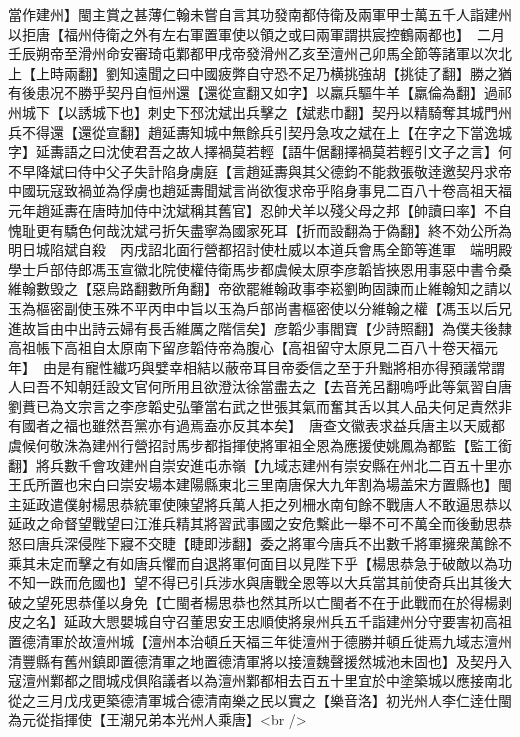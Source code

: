 當作建州】閩主賞之甚薄仁翰未嘗自言其功發南都侍衛及兩軍甲士萬五千人詣建州以拒唐【福州侍衛之外有左右軍置軍使以領之或曰兩軍謂拱宸控鶴兩都也】　二月壬辰朔帝至滑州命安審琦屯鄴都甲戌帝發滑州乙亥至澶州己卯馬全節等諸軍以次北上【上時兩翻】劉知遠聞之曰中國疲弊自守恐不足乃横挑強胡【挑徒了翻】勝之猶有後患况不勝乎契丹自恒州還【還從宣翻又如字】以羸兵驅牛羊【羸倫為翻】過祁州城下【以誘城下也】刺史下邳沈斌出兵擊之【斌悲巾翻】契丹以精騎奪其城門州兵不得還【還從宣翻】趙延夀知城中無餘兵引契丹急攻之斌在上【在字之下當逸城字】延夀語之曰沈使君吾之故人擇禍莫若輕【語牛倨翻擇禍莫若輕引文子之言】何不早降斌曰侍中父子失計陷身虜庭【言趙延夀與其父德鈞不能救張敬逹邀契丹求帝中國玩寇致禍並為俘虜也趙延夀聞斌言尚欲復求帝乎陷身事見二百八十卷高祖天福元年趙延夀在唐時加侍中沈斌稱其舊官】忍帥犬羊以殘父母之邦【帥讀曰率】不自愧耻更有驕色何哉沈斌弓折矢盡寧為國家死耳【折而設翻為于偽翻】終不効公所為明日城陷斌自殺　丙戌詔北面行營都招討使杜威以本道兵會馬全節等進軍　端明殿學士戶部侍郎馮玉宣徽北院使權侍衛馬步都虞候太原李彦韜皆挾恩用事惡中書令桑維翰數毁之【惡烏路翻數所角翻】帝欲罷維翰政事李崧劉昫固諫而止維翰知之請以玉為樞密副使玉殊不平丙申中旨以玉為戶部尚書樞密使以分維翰之權【馮玉以后兄進故旨由中出詩云婦有長舌維厲之階信矣】彦韜少事閻寶【少詩照翻】為僕夫後隸高祖帳下高祖自太原南下留彦韜侍帝為腹心【高祖留守太原見二百八十卷天福元年】　由是有寵性纎巧與嬖幸相結以蔽帝耳目帝委信之至于升黜將相亦得預議常謂人曰吾不知朝廷設文官何所用且欲澄汰徐當盡去之【去音羌呂翻嗚呼此等氣習自唐劉蕡已為文宗言之李彦韜史弘肇當右武之世張其氣而奮其舌以其人品夫何足責然非有國者之福也雖然吾黨亦有過焉盍亦反其本矣】　唐查文徽表求益兵唐主以天威都虞候何敬洙為建州行營招討馬步都指揮使將軍祖全恩為應援使姚鳳為都監【監工銜翻】將兵數千會攻建州自崇安進屯赤嶺【九域志建州有崇安縣在州北二百五十里亦王氏所置也宋白曰崇安場本建陽縣東北三里南唐保大九年割為場盖宋方置縣也】閩主延政遣僕射楊思恭統軍使陳望將兵萬人拒之列柵水南旬餘不戰唐人不敢逼思恭以延政之命督望戰望曰江淮兵精其將習武事國之安危繫此一舉不可不萬全而後動思恭怒曰唐兵深侵陛下寢不交睫【睫即涉翻】委之將軍今唐兵不出數千將軍擁衆萬餘不乘其未定而擊之有如唐兵懼而自退將軍何面目以見陛下乎【楊思恭急于破敵以為功不知一跌而危國也】望不得已引兵涉水與唐戰全恩等以大兵當其前使奇兵出其後大破之望死思恭僅以身免【亡閩者楊思恭也然其所以亡閩者不在于此戰而在於得楊剥皮之名】延政大愳嬰城自守召董思安王忠順使將泉州兵五千詣建州分守要害初高祖置德清軍於故澶州城【澶州本治頓丘天福三年徙澶州于德勝并頓丘徙焉九域志澶州清豐縣有舊州鎮即置德清軍之地置德清軍將以接澶魏聲援然城池未固也】及契丹入寇澶州鄴都之間城戍俱陷議者以為澶州鄴都相去百五十里宜於中塗築城以應接南北從之三月戊戌更築德清軍城合德清南樂之民以實之【樂音洛】初光州人李仁逹仕閩為元從指揮使【王潮兄弟本光州人乘唐】<br />
